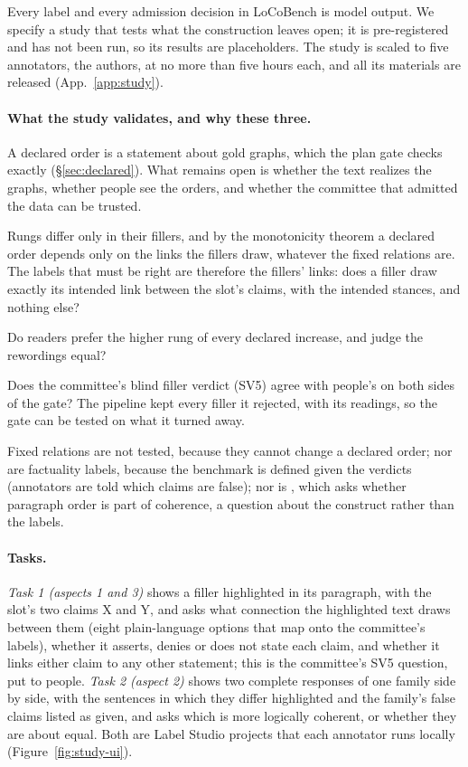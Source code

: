 \documentclass[11pt]{article}
\begin{document}
Every label and every admission decision in LoCoBench is model output. We specify a study that
tests what the construction leaves open; it is pre-registered and has not been run, so its results
are placeholders. The study is scaled to five annotators, the authors, at no more than five hours
each, and all its materials are released (App.~\ref{app:study}).

\paragraph{What the study validates, and why these three.} A declared order is a statement about
gold graphs, which the plan gate checks exactly (\S\ref{sec:declared}). What remains open is
whether the text realizes the graphs, whether people see the orders, and whether the committee
that admitted the data can be trusted.
\begin{description}[leftmargin=1.1em,itemsep=1pt,topsep=2pt,font=\normalfont\bfseries]
\item[1. Filler fidelity.] Rungs differ only in their fillers, and by the monotonicity theorem a
  declared order depends only on the links the fillers draw, whatever the fixed relations are.
  The labels that must be right are therefore the fillers' links: does a filler draw exactly its
  intended link between the slot's claims, with the intended stances, and nothing else?
\item[2. Ordering validity.] Do readers prefer the higher rung of every declared increase, and
  judge the  rewordings equal?
\item[3. Committee validity.] Does the committee's blind filler verdict (SV5) agree with people's
  on both sides of the gate? The pipeline kept every filler it rejected, with its readings, so the
  gate can be tested on what it turned away.
\end{description}
Fixed relations are not tested, because they cannot change a declared order; nor are factuality
labels, because the benchmark is defined given the verdicts (annotators are told which claims are
false); nor is , which asks whether paragraph order is part of coherence, a question
about the construct rather than the labels.

\paragraph{Tasks.} \emph{Task 1 (aspects 1 and 3)} shows a filler highlighted in its paragraph,
with the slot's two claims X and Y, and asks what connection the highlighted text draws between
them (eight plain-language options that map onto the committee's labels), whether it asserts,
denies or does not state each claim, and whether it links either claim to any other statement;
this is the committee's SV5 question, put to people. \emph{Task 2 (aspect 2)} shows two complete
responses of one family side by side, with the sentences in which they differ highlighted and the
family's false claims listed as given, and asks which is more logically coherent, or whether they
are about equal. Both are Label Studio projects that each annotator runs locally
(Figure~\ref{fig:study-ui}).
\end{document}
